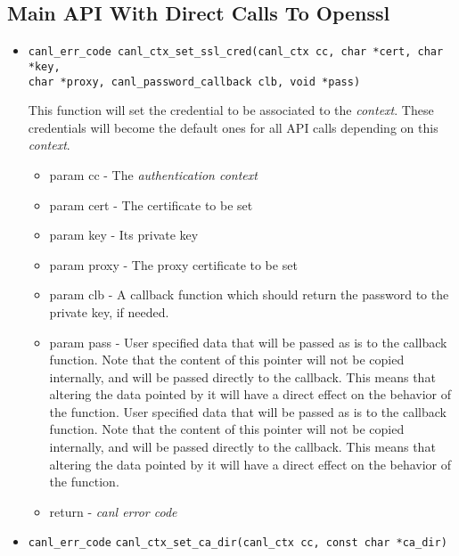 \subsection{Main API With Direct Calls To Openssl}

\begin{itemize}
  \item \begin{verbatim}canl_err_code canl_ctx_set_ssl_cred(canl_ctx cc, char *cert, char *key,
char *proxy, canl_password_callback clb, void *pass)\end{verbatim}
  This function will set the credential to be associated to the
  \textit{context}.  These credentials will become the default ones 
  for all API calls depending on this \textit{context}.
  \begin{itemize}
    \item param cc - The \textit{authentication context}
    \item param cert - The certificate to be set
    \item param key - Its private key
    \item param proxy - The proxy certificate to be set
    \item param clb - A callback function which should return 
    the password to the private key, if needed.
    \item param pass - User specified data that will be passed 
    as is to the callback function.  Note that the content of this 
    pointer will not be copied internally, and will be passed
    directly to the callback.  This means that altering the 
    data pointed by it will have
    a direct effect on the behavior of the function. User specified 
    data that will be passed as is to the callback function.  Note that
    the content of this pointer will not be copied internally, and 
    will be passed
    directly to the callback.  This means that altering the data 
    pointed by it will have a direct effect on the behavior of the function.
    \item return - \textit{canl error code}
  \end{itemize}
  \item \verb'canl_err_code'
  \verb'canl_ctx_set_ca_dir(canl_ctx cc, const char *ca_dir)'


\end{itemize}

